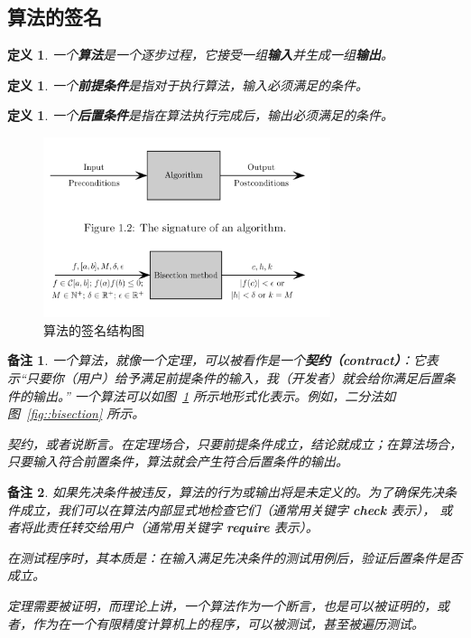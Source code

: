\documentclass[a4paper]{ctexart}
\newtheorem{remark}{备注}
\newtheorem{definition}[theorem]{定义} %
\numberwithin{theorem}{section}
\numberwithin{equation}{section}
\numberwithin{figure}{section}
\numberwithin{remark}{section}
\begin{document}
\subsection{算法的签名}

\begin{definition}
一个\textbf{算法}是一个逐步过程，它接受一组\textbf{输入}并生成一组\textbf{输出}。    
\end{definition}

\begin{definition}
一个\textbf{前提条件}是指对于执行算法，输入必须满足的条件。    
\end{definition}

\begin{definition}
一个\textbf{后置条件}是指在算法执行完成后，输出必须满足的条件。
\end{definition}

\begin{figure}
\centering
\includegraphics[width=0.75\textwidth]{images/algorithm_sign.png} %
\caption{算法的签名结构图}
\label{fig::signature}
\end{figure}

\begin{remark}
    \label{rem::contract}
一个算法，就像一个定理，可以被看作是一个\textbf{契约（contract）}：它表示“只要你（用户）给予满足前提条件的输入，我（开发者）就会给你满足后置条件的输出。” 
一个算法可以如图~\ref{fig::signature} 所示地形式化表示。例如，二分法如图~\ref{fig::bisection} 所示。

契约，或者说断言。在定理场合，只要前提条件成立，结论就成立；在算法场合，只要输入符合前置条件，算法就会产生符合后置条件的输出。
\end{remark}

\begin{remark}
如果先决条件被违反，算法的行为或输出将是未定义的。为了确保先决条件成立，我们可以在算法内部显式地检查它们（通常用关键字 \textbf{check} 表示），
或者将此责任转交给用户（通常用关键字 \textbf{require} 表示）。

在测试程序时，其本质是：在输入满足先决条件的测试用例后，验证后置条件是否成立。

定理需要被证明，而理论上讲，一个算法作为一个断言，也是可以被证明的，或者，作为在一个有限精度计算机上的程序，可以被测试，甚至被遍历测试。
\end{remark}
\end{document}
